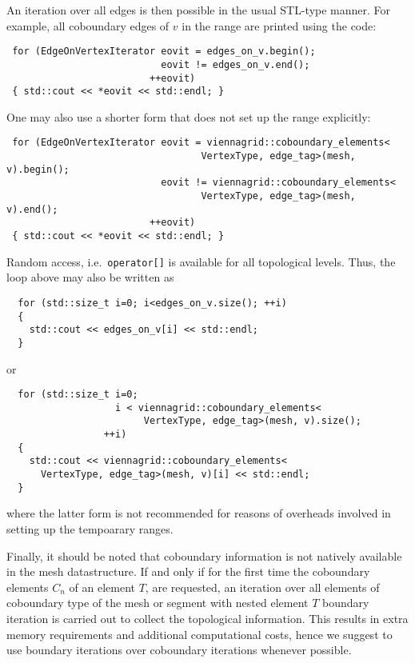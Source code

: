 An iteration over all edges is then possible in the usual STL-type manner. For example, all coboundary edges of $v$ in the range are printed using the code:
\begin{lstlisting}
 for (EdgeOnVertexIterator eovit = edges_on_v.begin();
                           eovit != edges_on_v.end();
                         ++eovit)
 { std::cout << *eovit << std::endl; }
\end{lstlisting}
One may also use a shorter form that does not set up the range explicitly:
\begin{lstlisting}
 for (EdgeOnVertexIterator eovit = viennagrid::coboundary_elements<
                                  VertexType, edge_tag>(mesh, v).begin();
                           eovit != viennagrid::coboundary_elements<
                                  VertexType, edge_tag>(mesh, v).end();
                         ++eovit)
 { std::cout << *eovit << std::endl; }
\end{lstlisting}

Random access, i.e.~\lstinline|operator[]| is available for all topological levels. Thus, the loop above may also be written as
\begin{lstlisting}
  for (std::size_t i=0; i<edges_on_v.size(); ++i)
  {
    std::cout << edges_on_v[i] << std::endl;
  }
\end{lstlisting}
or 
\begin{lstlisting}
  for (std::size_t i=0;
                   i < viennagrid::coboundary_elements<
                        VertexType, edge_tag>(mesh, v).size();
                 ++i)
  {
    std::cout << viennagrid::coboundary_elements<
      VertexType, edge_tag>(mesh, v)[i] << std::endl;
  }
\end{lstlisting}
where the latter form is not recommended for reasons of overheads involved in setting up the tempoarary ranges.

Finally, it should be noted that coboundary information is not natively available in the mesh datastructure. If and only if for the first time
the coboundary elements $C_n$ of an element $T$, are requested, an iteration over all elements of coboundary type of the mesh or segment with nested element $T$ boundary iteration is carried out to collect the topological information.
This results in extra memory requirements and additional computational costs, hence we suggest to use boundary iterations over coboundary iterations whenever possible.



